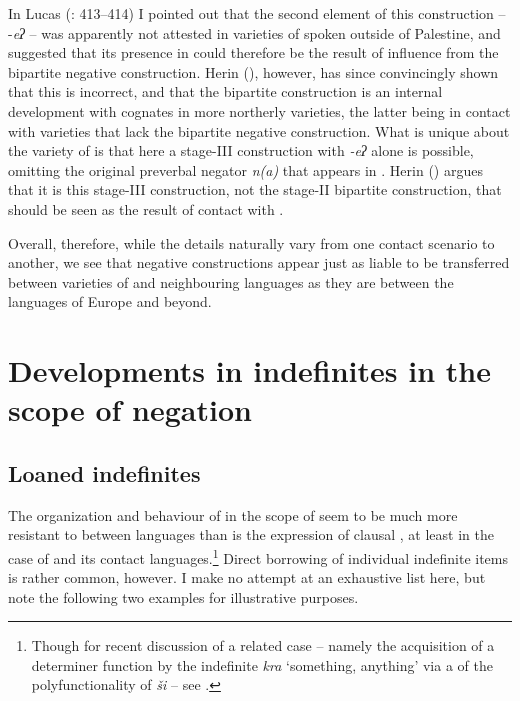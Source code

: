 \documentclass[output=paper]{langsci/langscibook}
\begin{document}
In Lucas (\citeyear{Lucas2013}: 413–414) I pointed out that the second element of this construction – -\textit{eʔ} – was apparently not attested in varieties of  spoken outside of Palestine, and suggested that its presence in   could therefore be the result of influence from the  bipartite negative construction. Herin (\citeyear{Herin2016,Herin2018}), however, has since convincingly shown that this is incorrect, and that the   bipartite construction is an internal development with cognates in more northerly varieties, the latter being in contact with  varieties that lack the bipartite negative construction. What is unique about the  variety of  is that here a stage-III construction with \textit{{}-eʔ} alone is possible, omitting the original preverbal negator \textit{n(a)} that appears in . Herin (\citeyear[32]{Herin2018}) argues that it is this stage-III construction, not the stage-II bipartite construction, that should be seen as the result of contact with  .

Overall, therefore, while the details naturally vary from one contact scenario to another, we see that negative constructions appear just as liable to be transferred between varieties of  and neighbouring languages as they are between the languages of Europe and beyond.


\section{Developments in indefinites in the scope of negation}\label{sec:sco}


\subsection{Loaned indefinites}


The organization and behaviour of  in the scope of  seem to be much more resistant to  between languages than is the expression of clausal , at least in the case of  and its contact languages.\footnote{Though for recent discussion of a related case – namely the acquisition of a determiner function by the  indefinite \textit{kra} ‘something, anything’ via a  of the polyfunctionality of   \textit{ši\-} – see \citet{Souag2018thing}.} Direct borrowing of individual indefinite items is rather common, however. I make no attempt at an exhaustive list here, but note the following two examples for illustrative purposes.
\end{document}
